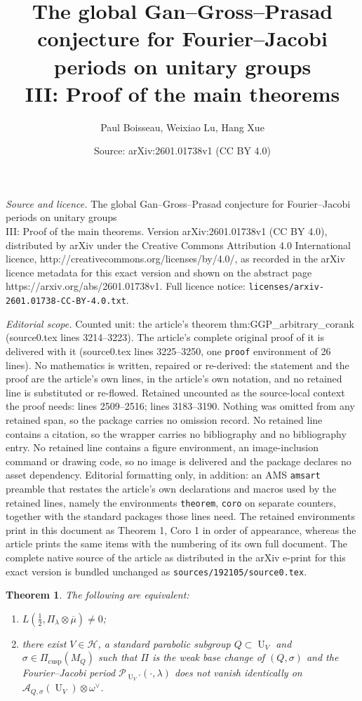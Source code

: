 \documentclass[10pt,a4paper]{amsart}
\title{The global Gan--Gross--Prasad conjecture for Fourier--Jacobi periods on unitary groups \\ III: Proof of the main theorems}
\author{Paul Boisseau, Weixiao Lu, Hang Xue}
\date{Source: arXiv:2601.01738v1 (CC BY 4.0)}
\newtheorem{theorem}{Theorem}
\DeclareMathOperator{\U}{U}
\newcommand{\cA}{\mathcal{A}}
\newcommand{\cH}{\mathcal{H}}
\newcommand{\cP}{\mathcal{P}}
\DeclareMathOperator{\cusp}{cusp}
\begin{document}
\maketitle

\noindent\emph{Source and licence.} The global Gan--Gross--Prasad conjecture for Fourier--Jacobi periods on unitary groups \\ III: Proof of the main theorems. Version arXiv:2601.01738v1 (CC BY 4.0), distributed by arXiv under the Creative Commons Attribution 4.0 International licence, http://creativecommons.org/licenses/by/4.0/, as recorded in the arXiv licence metadata for this exact version and shown on the abstract page https://arxiv.org/abs/2601.01738v1. Full licence notice: \texttt{licenses/arxiv-2601.01738-CC-BY-4.0.txt}.\par\smallskip

\noindent\textit{Editorial scope.} Counted unit: the article's theorem thm:GGP\_arbitrary\_corank (source0.tex lines 3214--3223). The article's complete original proof of it is delivered with it (source0.tex lines 3225--3250, one \texttt{proof} environment of 26 lines). No mathematics is written, repaired or re-derived: the statement and the proof are the article's own lines, in the article's own notation, and no retained line is substituted or re-flowed.  Retained uncounted as the source-local context the proof needs: lines 2509--2516; lines 3183--3190.  Nothing was omitted from any retained span, so the package carries no omission record.  No retained line contains a citation, so the wrapper carries no bibliography and no bibliography entry.  No retained line contains a figure environment, an image-inclusion command or drawing code, so no image is delivered and the package declares no asset dependency.  Editorial formatting only, in addition: an AMS \texttt{amsart} preamble that restates the article's own declarations and macros used by the retained lines, namely the environments \texttt{theorem}, \texttt{coro} on separate counters, together with the standard packages those lines need.  The retained environments print in this document as Theorem 1, Coro 1 in order of appearance, whereas the article prints the same items with the numbering of its own full document.  The complete native source of the article as distributed in the arXiv e-print for this exact version is bundled unchanged as \texttt{sources/192105/source0.tex}.
\begin{theorem} 
    \label{thm:ggp_intro}
    The following are equivalent:
    \begin{enumerate}
    \item $L(\frac{1}{2}, \Pi_\lambda \otimes  \overline{\mu}) \not=0$; 
    \item there exist $V \in \cH$, a standard parabolic subgroup $Q \subset \U_V$ and $\sigma \in \Pi_{\cusp}(M_Q)$ such that $\Pi$ is the weak base change of $(Q,\sigma)$ and the Fourier--Jacobi period $\cP_{\U_V'}(\cdot,\lambda)$ does not vanish identically on $\cA_{Q,\sigma}(\U_V) \otimes \omega^\vee$.
    \end{enumerate}
    \end{theorem}
\end{document}
